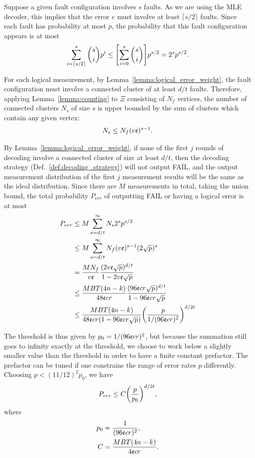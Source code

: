 Suppose a given fault configuration involves $s$ faults.
%
As we are using the MLE decoder, this implies that the error $e$ must involve at least $\lceil s/2\rceil$ faults.
%
Since each fault has probability at most $p$, the probability that this fault configuration appears is at most
\begin{align}
\sum_{i=\lceil s/2\rceil}^s {s \choose i}p^i\leq \qty[\sum_{i=0}^s {s \choose i}]p^{s/2}=2^s p^{s/2}.
\end{align}

For each logical measurement, by Lemma~\ref{lemma:logical_error_weight}, the fault configuration must involve a connected cluster of at least $d/t$ faults.
%
Therefore, applying Lemma~\ref{lemma:counting} to $\Xi$ consisting of $N_f$ vertices, the number of connected clusters $N_s$ of size $s$ is upper bounded by the sum of clusters which contain any given vertex:
\begin{align}
N_s\leq N_f (v\mathfrak{e})^{s-1}.
\end{align}

By Lemma~\ref{lemma:logical_error_weight}, if none of the first $j$ rounds of decoding involve a connected cluster of size at least $d/t$, then the decoding strategy (Def.~\ref{def:decoding_strategy}) will not output FAIL, and the output measurement distribution of the first $j$ measurement results will be the same as the ideal distribution.
%
Since there are $M$ measurements in total, taking the union bound, the total probability $P_{err}$ of outputting FAIL or having a logical error is at most
\begin{align}
P_{err}&\leq M\sum_{s=d/t}^\infty N_s 2^s p^{s/2}\nonumber\\
&\leq M\sum_{s=d/t}^\infty N_f(v\mathfrak{e})^{s-1}(2\sqrt{p})^s\nonumber\\
&= \frac{MN_f}{v\mathfrak{e}}\frac{(2v\mathfrak{e}\sqrt{p})^{d/t}}{1-2v\mathfrak{e}\sqrt{p}}\nonumber\\
&\leq \frac{MBT(4n-k)}{48\mathfrak{e} cr}\frac{(96\mathfrak{e} cr\sqrt{p})^{d/t}}{1-96\mathfrak{e} cr\sqrt{p}}\nonumber\\
&\leq \frac{MBT(4n-k)}{48\mathfrak{e} cr(1-96\mathfrak{e} cr\sqrt{p})}\qty(\frac{p}{1/(96\mathfrak{e} cr)^2})^{d/2t}
\end{align}

The threshold is thus given by $p_0=1/(96\mathfrak{e} cr)^2$, but because the summation still goes to infinity exactly at the threshold, we choose to work below a slightly smaller value than the threshold in order to have a finite constant prefactor.
%
The prefactor can be tuned if one constrains the range of error rates $p$ differently.
%
Choosing $p<(11/12)^2 p_0$, we have
\begin{align}
P_{err}\leq C\qty(\frac{p}{p_0})^{d/2t},
\end{align}
where
\begin{align}
p_0&=\frac{1}{(96\mathfrak{e} cr)^2},\label{eq:p0}\\
C&=\frac{MBT(4n-k)}{4\mathfrak{e} cr}.\label{eq:c}
\end{align}

